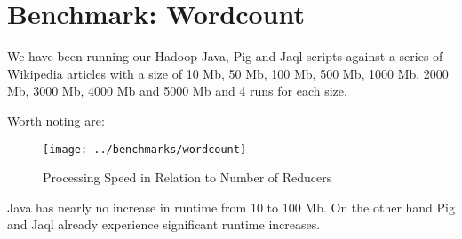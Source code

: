 \section{Benchmark: Wordcount}            

We have been running our Hadoop Java, Pig and Jaql scripts against a series of Wikipedia articles with a size of 10 Mb, 50 Mb, 100 Mb, 500 Mb, 1000 Mb, 2000 Mb, 3000 Mb, 4000 Mb and 5000 Mb and 4 runs for each size.


Worth noting are:

\begin{figure}[H]
  \begin{center}
    \texttt{[image: ../benchmarks/wordcount]}
  \end{center}
  \caption{Processing Speed in Relation to Number of Reducers}
  \label{fig:reducers}
\end{figure}

Java has nearly no increase in runtime from 10 to 100 Mb. On the other hand Pig and Jaql already experience significant runtime increases.
